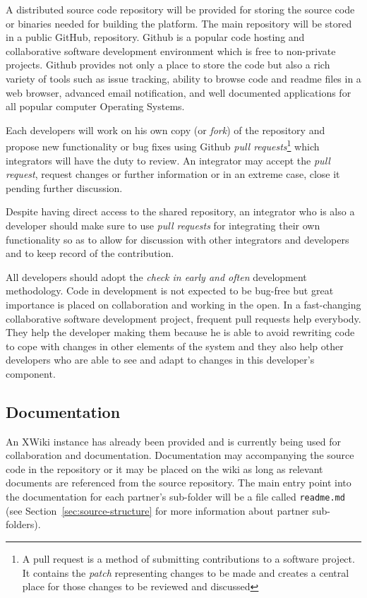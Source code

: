 A distributed source code repository will be provided for storing the source code or binaries
needed for building the \learnpad platform. The main repository will be stored in a public GitHub,
repository. Github is a popular code hosting and collaborative software development environment
which is free to non-private projects. Github provides not only a place to store the code but also
a rich variety of tools such as issue tracking, ability to browse code and readme files in a web
browser, advanced email notification, and well documented applications for all popular computer
Operating Systems.

Each developers will work on his own copy (or \emph{fork}) of the repository and propose new
functionality or bug fixes using Github \emph{pull requests}\footnote{A pull request is a method of
submitting contributions to a software project. It contains the \emph{patch} representing changes to
be made and creates a central place for those changes to be reviewed and discussed} which
integrators will have the duty to review. An integrator may accept the \emph{pull request},
request changes or further information or in an extreme case, close it pending further discussion.

Despite having direct access to the shared repository, an integrator who is also a developer should
make sure to use \emph{pull requests} for integrating their own functionality so as to allow for
discussion with other integrators and developers and to keep record of the contribution.

All developers should adopt the \emph{check in early and often} development methodology.
Code in development is not expected to be bug-free but great importance is placed on collaboration
and working in the open. In a fast-changing collaborative software development project, frequent
pull requests help everybody. They help the developer making them because he is able to avoid
rewriting code to cope with changes in other elements of the system and they also help other
developers who are able to see and adapt to changes in this developer's component.

\subsection{Documentation}
\label{sec:documentation}

An XWiki instance has already been provided and is currently being used for collaboration and
documentation. Documentation may accompanying the source code in the
repository or it may be placed on the wiki as long as relevant documents are referenced from the
source repository. The main entry point into the documentation for each partner's sub-folder will
be a file called \texttt{readme.md} (see Section~\ref{sec:source-structure} for more information
about partner sub-folders).


